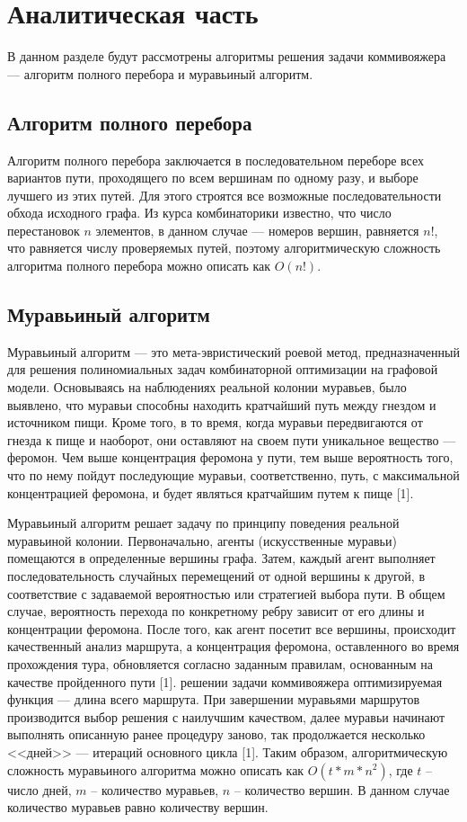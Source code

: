 \documentclass{bmstu}
\begin{document}
\chapter{Аналитическая часть}

В данном разделе будут рассмотрены алгоритмы решения задачи коммивояжера --- алгоритм полного перебора и муравьиный алгоритм.

\section{Алгоритм полного перебора}
Алгоритм полного перебора заключается в последовательном переборе всех вариантов пути, проходящего по всем вершинам по одному разу, и выборе лучшего из этих путей. Для этого строятся все возможные последовательности обхода исходного графа. Из курса комбинаторики известно, что число перестановок $n$ элементов, в данном случае --- номеров вершин, равняется $n!$, что равняется числу проверяемых путей, поэтому алгоритмическую сложность алгоритма полного перебора можно описать как $O(n!)$.

\section{Муравьиный алгоритм}
Муравьиный алгоритм --- это мета-эвристический
роевой метод, предназначенный для решения полиномиальных задач
комбинаторной оптимизации на графовой модели. Основываясь на наблюдениях реальной колонии муравьев,
было выявлено, что муравьи способны находить кратчайший путь между гнездом
и источником пищи. Кроме того, в то время, когда муравьи передвигаются от гнезда к пище и наоборот, они оставляют на своем пути уникальное вещество ---
феромон. Чем выше концентрация феромона у пути, тем выше вероятность того, что по нему пойдут последующие муравьи, соответственно, путь, с максимальной
концентрацией феромона, и будет являться кратчайшим путем к пище [1].
\par Муравьиный алгоритм решает задачу по принципу поведения реальной муравьиной колонии. Первоначально, агенты (искусственные муравьи) помещаются в определенные
вершины графа. Затем, каждый агент выполняет последовательность случайных
перемещений от одной вершины к другой, в соответствие с задаваемой
вероятностью или стратегией выбора пути. В общем случае, вероятность перехода
по конкретному ребру зависит от его длины и концентрации феромона. После
того, как агент посетит все вершины, происходит качественный анализ маршрута,
а концентрация феромона, оставленного во время прохождения тура, обновляется
согласно заданным правилам, основанным на качестве пройденного пути [1].
решении задачи коммивояжера оптимизируемая функция --- длина всего маршрута. При завершении муравьями маршрутов
производится выбор решения с наилучшим качеством, далее муравьи начинают
выполнять описанную ранее процедуру заново, так продолжается несколько <<дней>> --- итераций основного цикла [1]. Таким образом, алгоритмическую сложность муравьиного алгоритма можно описать как $O(t * m * n ^ 2)$, где $t$ -- число дней, $m$ -- количество муравьев, $n$ -- количество вершин. В данном случае количество муравьев равно количеству вершин.
\end{document}
